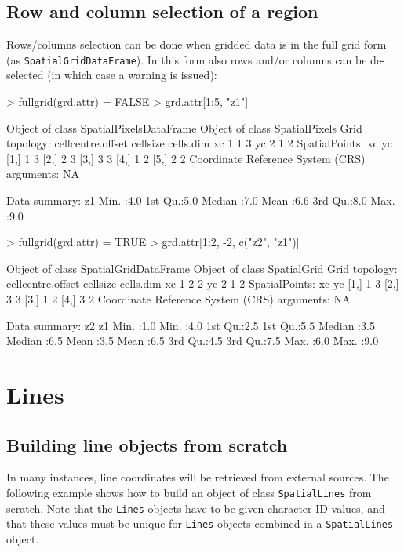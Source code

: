\documentclass{article}
\begin{document}
\subsection{Row and column selection of a region}
Rows/columns selection can be done when gridded data is in the full grid
form (as {\tt SpatialGridDataFrame}). In this form also rows and/or columns
can be de-selected (in which case a warning is issued):
\begin{Schunk}
\begin{Sinput}
> fullgrid(grd.attr) = FALSE
> grd.attr[1:5, "z1"]
\end{Sinput}
\begin{Soutput}
Object of class SpatialPixelsDataFrame
Object of class SpatialPixels
Grid topology:
   cellcentre.offset cellsize cells.dim
xc                 1        1         3
yc                 2        1         2
SpatialPoints:
     xc yc
[1,]  1  3
[2,]  2  3
[3,]  3  3
[4,]  1  2
[5,]  2  2
Coordinate Reference System (CRS) arguments: NA 

Data summary:
       z1     
 Min.   :4.0  
 1st Qu.:5.0  
 Median :7.0  
 Mean   :6.6  
 3rd Qu.:8.0  
 Max.   :9.0  
\end{Soutput}
\begin{Sinput}
> fullgrid(grd.attr) = TRUE
> grd.attr[1:2, -2, c("z2", "z1")]
\end{Sinput}
\begin{Soutput}
Object of class SpatialGridDataFrame
Object of class SpatialGrid
Grid topology:
   cellcentre.offset cellsize cells.dim
xc                 1        2         2
yc                 2        1         2
SpatialPoints:
     xc yc
[1,]  1  3
[2,]  3  3
[3,]  1  2
[4,]  3  2
Coordinate Reference System (CRS) arguments: NA 

Data summary:
       z2            z1     
 Min.   :1.0   Min.   :4.0  
 1st Qu.:2.5   1st Qu.:5.5  
 Median :3.5   Median :6.5  
 Mean   :3.5   Mean   :6.5  
 3rd Qu.:4.5   3rd Qu.:7.5  
 Max.   :6.0   Max.   :9.0  
\end{Soutput}
\end{Schunk}

\section{Lines}

\subsection{Building line objects from scratch}
In many instances, line coordinates will be retrieved from external
sources.  The following example shows how to build an object of class
{\tt SpatialLines} from scratch. Note that the {\tt Lines} objects have to be given character ID values, and that these values must be unique for {\tt Lines} objects combined in a {\tt SpatialLines} object.
\end{document}
